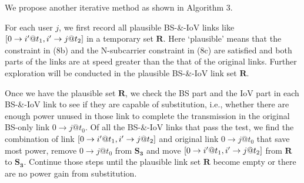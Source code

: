 \documentclass[conference]{IEEEtran}
\begin{document}
We propose another iterative method as shown in Algorithm 3. 


For each user $j$, we first record all plausible BS-\&-IoV links like $\left[ {{\rm{0}} \to i'@{t_1},i' \to j@{t_2}} \right]$ in a temporary set $\mathbf{R}$. Here `plausible' means that the constraint in (8b) and the N-subcarrier constraint in (8c) are satisfied and both parts of the links are at speed greater than the that of the original links. Further exploration will be conducted in the plausible BS-\&-IoV link set $\mathbf{R}$.

Once we have the plausible set $\mathbf{R}$, we check the BS part and the IoV part in each BS-\&-IoV link to see if they are capable of substitution, i.e., whether there are enough power unused in those link to complete the transmission in the original BS-only link $0 \to j @{t_0}$. Of all the BS-\&-IoV links that pass the test, we find the combination of link $\left[ {{\rm{0}} \to i'@{t_1},i' \to j@{t_2}} \right]$ and original link $0 \to j @{t_0}$ that save most power, remove $0 \to j @{t_0}$ from ${{\mathbf{S}}_{\mathbf{3}}}$ and move $\left[ {{\rm{0}} \to i'@{t_1},i' \to j@{t_2}} \right]$ from $\mathbf{R}$ to ${{\mathbf{S}}_{\mathbf{3}}}$. Continue those steps until the plausible link set $\mathbf{R}$ become empty or there are no power gain from substitution.
\end{document}
